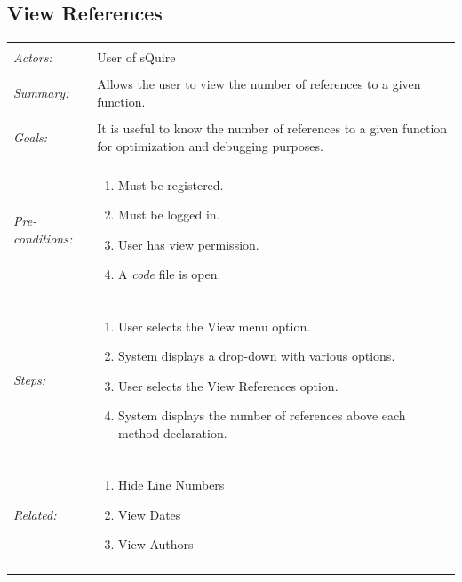 \documentclass[11pt]{report}
\begin{document}
\subsection{View References}
\begin{tabular}{ p{2cm} p{12cm} }
\hline
\\
	\textit{Actors:} & User of sQuire \\
	\\
	\textit{Summary:} & Allows the user to view the number of references to a given function. \\
	\\
	\textit{Goals:} & It is useful to know the number of references to a given function for optimization and debugging purposes. \\
	\\
	\textit{Pre-conditions:} &  \begin{enumerate}
		\item Must be registered.
		\item Must be logged in.
		\item User has view permission.
		\item A \textit{code} file is open.
	\end{enumerate} \\
	\\
	\textit{Steps:} & \begin{enumerate}
		\item User selects the View menu option.
		\item System displays a drop-down with various options.
		\item User selects the View References option.
		\item System displays the number of references above each method declaration.
	\end{enumerate} \\
	\\
	\textit{Related:} & \begin{enumerate}
		\item Hide Line Numbers
		\item View Dates
		\item View Authors
	\end{enumerate} \\
	\\
\hline
\end{tabular}
\newpage
\end{document}
